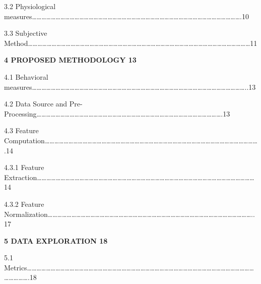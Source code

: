 \documentclass[a4paper,12pt]{article}
\begin{document}
3.2 Physiological
measures\ldots\ldots\ldots\ldots\ldots\ldots\ldots\ldots\ldots\ldots\ldots\ldots\ldots\ldots\ldots\ldots\ldots\ldots\ldots\ldots\ldots\ldots\ldots\ldots\ldots\ldots\ldots\ldots\ldots\ldots\ldots\ldots\ldots\ldots\ldots\ldots\ldots\ldots\ldots\ldots\ldots\ldots\ldots\ldots.10

3.3 Subjective
Method\ldots\ldots\ldots\ldots\ldots\ldots\ldots\ldots\ldots\ldots\ldots\ldots\ldots\ldots\ldots\ldots\ldots\ldots\ldots\ldots\ldots\ldots\ldots\ldots\ldots\ldots\ldots\ldots\ldots\ldots\ldots\ldots\ldots\ldots\ldots\ldots\ldots\ldots\ldots\ldots\ldots\ldots\ldots\ldots\ldots\ldots\ldots11

\textbf{4 PROPOSED METHODOLOGY 13}

4.1 Behavioral
measures\ldots\ldots\ldots\ldots\ldots\ldots\ldots\ldots\ldots\ldots\ldots\ldots\ldots\ldots\ldots\ldots\ldots\ldots\ldots\ldots\ldots\ldots\ldots\ldots\ldots\ldots\ldots\ldots\ldots\ldots\ldots\ldots\ldots\ldots\ldots\ldots\ldots\ldots\ldots\ldots\ldots\ldots\ldots\ldots\ldots..13

4.2 Data Source and
Pre-Processing\ldots\ldots\ldots\ldots\ldots\ldots\ldots\ldots\ldots\ldots\ldots\ldots\ldots\ldots\ldots\ldots\ldots\ldots\ldots\ldots\ldots\ldots\ldots\ldots\ldots\ldots\ldots\ldots\ldots\ldots\ldots\ldots\ldots\ldots\ldots\ldots\ldots\ldots\ldots.13

4.3 Feature
Computation\ldots\ldots\ldots\ldots\ldots\ldots\ldots\ldots\ldots\ldots\ldots\ldots\ldots\ldots\ldots\ldots\ldots\ldots\ldots\ldots\ldots\ldots\ldots\ldots\ldots\ldots\ldots\ldots\ldots\ldots\ldots\ldots\ldots\ldots\ldots\ldots\ldots\ldots\ldots\ldots\ldots\ldots\ldots\ldots\ldots.14

4.3.1 Feature
Extraction\ldots\ldots\ldots\ldots\ldots\ldots\ldots\ldots\ldots\ldots\ldots\ldots\ldots\ldots\ldots\ldots\ldots\ldots\ldots\ldots\ldots\ldots\ldots\ldots\ldots\ldots\ldots\ldots\ldots\ldots\ldots\ldots\ldots\ldots\ldots\ldots\ldots\ldots\ldots\ldots\ldots\ldots\ldots\ldots\ldots\ldots14

4.3.2 Feature
Normalization\ldots\ldots\ldots\ldots\ldots\ldots\ldots\ldots\ldots\ldots\ldots\ldots\ldots\ldots\ldots\ldots\ldots\ldots\ldots\ldots\ldots\ldots\ldots\ldots\ldots\ldots\ldots\ldots\ldots\ldots\ldots\ldots\ldots\ldots\ldots\ldots\ldots\ldots\ldots\ldots\ldots\ldots\ldots..17

\textbf{5 DATA EXPLORATION 18}

5.1
Metrics\ldots\ldots\ldots\ldots\ldots\ldots\ldots\ldots\ldots\ldots\ldots\ldots\ldots\ldots\ldots\ldots\ldots\ldots\ldots\ldots\ldots\ldots\ldots\ldots\ldots\ldots\ldots\ldots\ldots\ldots\ldots\ldots\ldots\ldots\ldots\ldots\ldots\ldots\ldots\ldots\ldots\ldots\ldots\ldots\ldots\ldots\ldots\ldots\ldots\ldots\ldots\ldots\ldots.18
\end{document}
